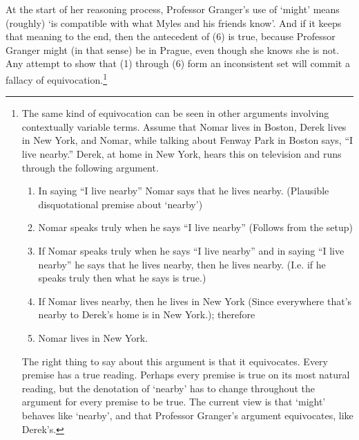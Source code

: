 \documentclass[
  11pt,
  letterpaper,
  DIV=11,
  numbers=noendperiod,
  twoside]{scrartcl}
\providecommand{\tightlist}{%
  \setlength{\itemsep}{0pt}\setlength{\parskip}{0pt}}
\begin{document}
At the start of her reasoning process, Professor Granger's use of
`might' means (roughly) `is compatible with what Myles and his friends
know'. And if it keeps that meaning to the end, then the antecedent of
(6) is true, because Professor Granger might (in that sense) be in
Prague, even though she knows she is not. Any attempt to show that (1)
through (6) form an inconsistent set will commit a fallacy of
equivocation.\footnote{The same kind of equivocation can be seen in
  other arguments involving contextually variable terms. Assume that
  Nomar lives in Boston, Derek lives in New York, and Nomar, while
  talking about Fenway Park in Boston says, ``I live nearby.'' Derek, at
  home in New York, hears this on television and runs through the
  following argument.

  \begin{enumerate}
  \def\labelenumi{\arabic{enumi}.}
  \tightlist
  \item
    In saying ``I live nearby'' Nomar says that he lives nearby.
    (Plausible disquotational premise about `nearby')
  \item
    Nomar speaks truly when he says ``I live nearby'' (Follows from the
    setup)
  \item
    If Nomar speaks truly when he says ``I live nearby'' and in saying
    ``I live nearby'' he says that he lives nearby, then he lives
    nearby. (I.e. if he speaks truly then what he says is true.)
  \item
    If Nomar lives nearby, then he lives in New York (Since everywhere
    that's nearby to Derek's home is in New York.); therefore
  \item
    Nomar lives in New York.
  \end{enumerate}

  The right thing to say about this argument is that it equivocates.
  Every premise has a true reading. Perhaps every premise is true on its
  most natural reading, but the denotation of `nearby' has to change
  throughout the argument for every premise to be true. The current view
  is that `might' behaves like `nearby', and that Professor Granger's
  argument equivocates, like Derek's.}
\end{document}
